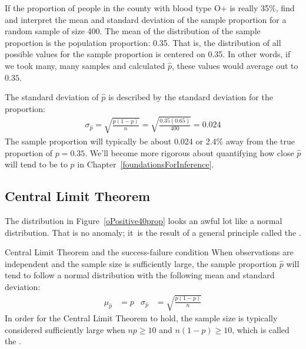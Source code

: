 \begin{examplewrap}
\begin{nexample}{If the proportion of people in the county with blood type O+ is really 35\%, find and interpret the mean and standard deviation of the sample proportion for a random sample of size 400.}
The mean of the distribution of the sample proportion is the population proportion: 0.35. That is, the distribution of all possible values for the sample proportion is centered on 0.35.  In other words, if we took many, many samples and calculated $\hat{p}$, these values would average out to $0.35$.  

The standard deviation of $\hat{p}$ is described by the standard deviation for the proportion:
\begin{align*}
\sigma_{\hat{p}}
	= \sqrt{\frac{p(1-p)}{n}}
	= \sqrt{\frac{0.35(0.65)}{400}}
	= 0.024
\end{align*}
The sample proportion will typically be about 0.024 or 2.4\% away from the true proportion of $p = 0.35$. We'll become more rigorous about quantifying how close $\hat{p}$ will tend to be to $p$ in Chapter~\ref{foundationsForInference}.
\end{nexample}
\end{examplewrap}


\subsection{Central Limit Theorem}

The distribution in
Figure~\ref{oPositive40prop} looks an awful lot like
a normal distribution. That is no anomaly; it~is the result
of a general principle called the
.

\begin{onebox}{Central Limit Theorem and the success-failure condition}
  When observations are independent and the sample size is
  sufficiently large, the sample proportion $\hat{p}$ will tend
  to follow a normal distribution with the following mean and
  standard deviation:%
  \begin{align*}
    \mu_{\hat{p}} &= p
    &\sigma_{\hat{p}} &= \sqrt{\frac{p (1 - p)}{n}}
  \end{align*}
  In order for the Central Limit Theorem to hold,
  the sample size is typically considered sufficiently large
  when $np \geq 10$ and $n(1-p) \geq 10$, which is called the
  .
\end{onebox}


